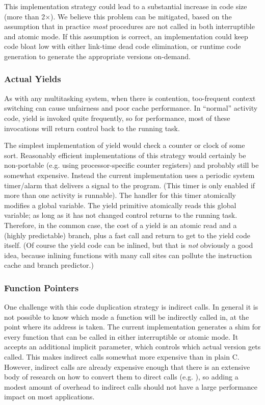 \documentclass[acmsmall,anonymous,review]{acmart}\settopmatter{printfolios=true,printccs=false,printacmref=false}
\begin{document}
This implementation strategy could lead to a substantial increase in code size (more than 2$\times$).
We believe this problem can be mitigated, based on the assumption that in practice \emph{most} procedures are not called in both interruptible and atomic mode.
If this assumption is correct, an implementation could keep code bloat low with either link-time dead code elimination, or runtime code generation to generate the appropriate versions on-demand.

\subsubsection{Actual Yields}

As with any multitasking system, when there is contention, too-frequent context switching can cause unfairness and poor cache performance.
In ``normal'' activity code, yield is invoked quite frequently, so for performance, most of these invocations will return control back to the running task.

The simplest implementation of yield would check a counter or clock of some sort.
Reasonably efficient implementations of this strategy would certainly be non-portable (e.g. using processor-specific counter registers) and probably still be somewhat expensive.
Instead the current \charcoal{} implementation uses a periodic system timer/alarm that delivers a signal to the program.
(This timer is only enabled if more than one activity is runnable).
The handler for this timer atomically modifies a global variable.
The yield primitive atomically reads this global variable; as long as it has not changed control returns to the running task.
Therefore, in the common case, the cost of a yield is an atomic read and a (highly predictable) branch, plus a fast call and return to get to the yield code itself.
(Of course the yield code can be inlined, but that is \emph{not} obviously a good idea, because inlining functions with many call sites can pollute the instruction cache and branch predictor.)

\subsubsection{Function Pointers}

One challenge with this code duplication strategy is indirect calls.
In general it is not possible to know which mode a function will be indirectly called in, at the point where its address is taken.
The current implementation generates a shim for every function that can be called in either interruptible or atomic mode.
It accepts an additional implicit parameter, which controls which actual version gets called.
This makes indirect calls somewhat more expensive than in plain C.
However, indirect calls are already expensive enough that there is an extensive body of research on how to convert them to direct calls (e.g. \cite{Dean1995}), so adding a modest amount of overhead to indirect calls should not have a large performance impact on most applications.
\end{document}
